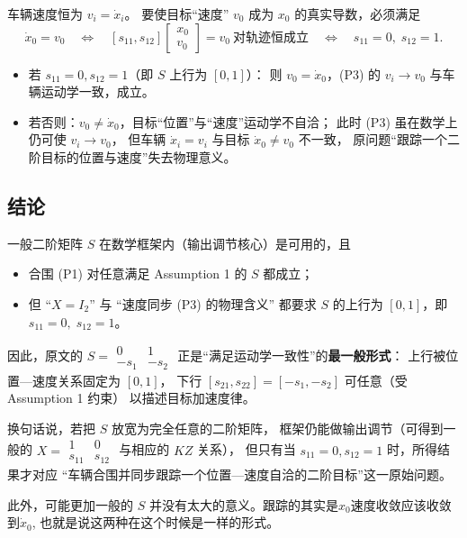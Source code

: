 车辆速度恒为 $v_i=\dot x_i$。
要使目标“速度” $v_0$ 成为 $x_0$ 的真实导数，必须满足
\[
\dot x_0 = v_0
\quad\Longleftrightarrow\quad
[s_{11},s_{12}]\begin{bmatrix}x_0\\ v_0\end{bmatrix}=v_0
\ \text{对轨迹恒成立}
\quad\Longleftrightarrow\quad
s_{11}=0,\;s_{12}=1.
\]
\begin{itemize}
  \item 若 $s_{11}=0,s_{12}=1$（即 $S$ 上行为 $[0,1]$）：
    则 $v_0=\dot x_0$，(P3) 的 $v_i\to v_0$ 与车辆运动学一致，成立。
  \item 若否则：$v_0\neq\dot x_0$，目标“位置”与“速度”运动学不自洽；
    此时 (P3) 虽在数学上仍可使 $v_i\to v_0$，
    但车辆 $\dot x_i=v_i$ 与目标 $\dot x_0\neq v_0$ 不一致，
    原问题“跟踪一个二阶目标的位置与速度”失去物理意义。
\end{itemize}

\subsection{结论}

一般二阶矩阵 $S$ 在数学框架内（输出调节核心）是可用的，且
\begin{itemize}
  \item 合围 (P1) 对任意满足 Assumption 1 的 $S$ 都成立；
  \item 但 “$X=I_2$” 与 “速度同步 (P3) 的物理含义” 都要求
    $S$ 的上行为 $[0,1]$，即 $s_{11}=0,\;s_{12}=1$。
\end{itemize}
因此，原文的 $S=\begin{smallmatrix}0&1\\-s_1&-s_2\end{smallmatrix}$
正是“满足运动学一致性”的\textbf{最一般形式}：
上行被位置—速度关系固定为 $[0,1]$，
下行 $[s_{21},s_{22}]=[-s_1,-s_2]$ 可任意（受 Assumption 1 约束）
以描述目标加速度律。

换句话说，若把 $S$ 放宽为完全任意的二阶矩阵，
框架仍能做输出调节（可得到一般的
$X=\begin{smallmatrix}1&0\\s_{11}&s_{12}\end{smallmatrix}$ 与相应的 $KZ$ 关系），
但只有当 $s_{11}=0,s_{12}=1$ 时，所得结果才对应
“车辆合围并同步跟踪一个位置—速度自洽的二阶目标”这一原始问题。

此外，可能更加一般的 $S$ 并没有太大的意义。跟踪的其实是$x_0$速度收敛应该收敛到$\dot{x}_0$, 也就是说这两种在这个时候是一样的形式。
